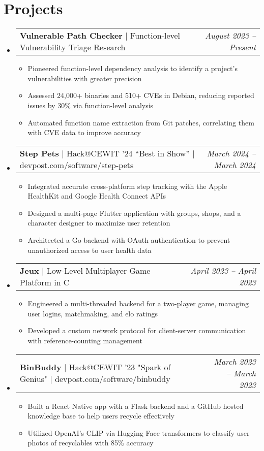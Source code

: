 \documentclass[letterpaper,11pt]{article}
\makeatletter
\newcommand{\resumeItem}[1]{
  \item\small{
    {#1 \vspace{-2pt}}
  }
}
\newcommand{\resumeProjectHeading}[2]{
    \item
    \begin{tabular*}{0.97\textwidth}{l@{\extracolsep{\fill}}r}
      \small#1 & \textit{\small #2} \\
    \end{tabular*}\vspace{-7pt}
}
\newcommand{\resumeSubHeadingListStart}{\begin{itemize}[leftmargin=0.15in, label={}]}
\newcommand{\resumeSubHeadingListEnd}{\end{itemize}}
\newcommand{\resumeItemListStart}{\begin{itemize}}
\newcommand{\resumeItemListEnd}{\end{itemize}\vspace{-5pt}}
\makeatother
\begin{document}
\section{Projects}
    \resumeSubHeadingListStart
        \resumeProjectHeading
        {\textbf{Vulnerable Path Checker} $|$ Function-level Vulnerability Triage Research}{August 2023 -- Present}
        \resumeItemListStart
            \resumeItem{Pioneered function-level dependency analysis to identify a project's vulnerabilities with greater precision}
            \resumeItem{Assessed 24,000+ binaries and 510+ CVEs in Debian, reducing reported issues by 30\% via function-level analysis}
            \resumeItem{Automated function name extraction from Git patches, correlating them with CVE data to improve accuracy}
        \resumeItemListEnd

        \resumeProjectHeading
        {\textbf{Step Pets} $|$ Hack@CEWIT '24 “Best in Show” $|$ devpost.com/software/step-pets}{March 2024 -- March 2024}
        \resumeItemListStart
            \resumeItem{Integrated accurate cross-platform step tracking with the Apple HealthKit and Google Health Connect APIs}
            \resumeItem{Designed a multi-page Flutter application with groups, shops, and a character designer to maximize user retention}
            \resumeItem{Architected a Go backend with OAuth authentication to prevent unauthorized access to user health data}
        \resumeItemListEnd

        \resumeProjectHeading
        {\textbf{Jeux} $|$ Low-Level Multiplayer Game Platform in C}{April 2023 -- April 2023}
        \resumeItemListStart
            \resumeItem{Engineered a multi-threaded backend for a two-player game, managing user logins, matchmaking, and elo ratings}
            \resumeItem{Developed a custom network protocol for client-server communication with reference-counting management}
        \resumeItemListEnd

        \resumeProjectHeading
        {\textbf{BinBuddy} $|$ Hack@CEWIT '23 "Spark of Genius" $|$ devpost.com/software/binbuddy}{March 2023 -- March 2023}
        \resumeItemListStart
            \resumeItem{Built a React Native app with a Flask backend and a GitHub hosted knowledge base to help users recycle effectively}
            \resumeItem{Utilized OpenAI's CLIP via Hugging Face transformers to classify user photos of recyclables with 85\% accuracy}
        \resumeItemListEnd
    \resumeSubHeadingListEnd

\end{document}
